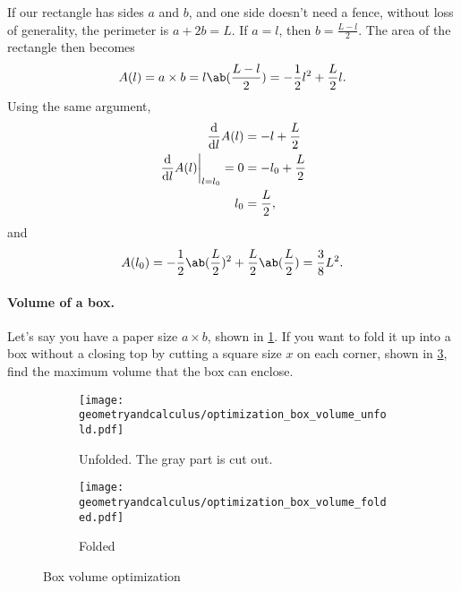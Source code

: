 If our rectangle has sides $a$ and $b$, and one side doesn't need a fence, without loss of generality, the perimeter is $a + 2b = L$. If $a = l$, then $b = \frac{L - l}{2}$. The area of the rectangle then becomes
\begin{equation}
	A(l) = a \times b = l\ab(\frac{L - l}{2}) = - \frac{1}{2}l^2 + \frac{L}{2}l. 
\end{equation}
Using the same argument,
\begin{align}
	\odv*{A(l)}{l} &= -l + \frac{L}{2} \\
	\odv*{A(l)}{l}_{l = l_0} = 0 &= -l_0 + \frac{L}{2} \\
	l_0 &= \frac{L}{2},
\end{align}
and
\begin{align}
	A(l_0) = -\frac{1}{2}\ab(\frac{L}{2})^2 + \frac{L}{2}\ab(\frac{L}{2}) = \frac{3}{8}L^2.
\end{align}

\paragraph{Volume of a box.} Let's say you have a paper size $a \times b$, shown in \cref{fig:optimization_box_volume_unfold}. If you want to fold it up into a box without a closing top by cutting a square size $x$ on each corner, shown in \cref{fig:optimization_box_volume_folded}, find the maximum volume that the box can enclose.

\begin{figure}[ht]
	\centering
	\begin{subfigure}[b]{0.51\textwidth}
		\centering
		\texttt{[image: geometryandcalculus/optimization\_box\_volume\_unfold.pdf]}
		\caption{Unfolded. The gray part is cut out.}
		\label{fig:optimization_box_volume_unfold}
	\end{subfigure}
	\begin{subfigure}[b]{0.43\textwidth}
		\centering
		\texttt{[image: geometryandcalculus/optimization\_box\_volume\_folded.pdf]}
		\caption{Folded}
		\label{fig:optimization_box_volume_folded}
	\end{subfigure}
	\caption{Box volume optimization}
\end{figure}

